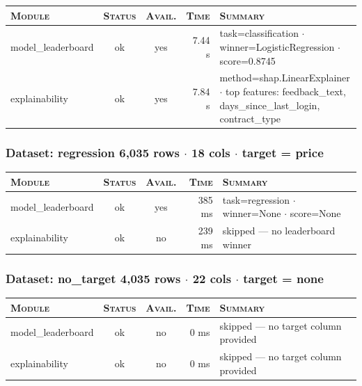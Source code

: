 \documentclass[11pt,a4paper]{article}
\begin{document}
\begin{tabularx}{\linewidth}{l c c r X}
\toprule
\textsc{Module} & \textsc{Status} & \textsc{Avail.} & \textsc{Time} & \textsc{Summary} \\
\midrule
model\_leaderboard & \textcolor{ok}{ok} & \textcolor{ok}{yes} & 7.44 s & task=classification $\cdot$ winner=LogisticRegression $\cdot$ score=0.8745 \\
explainability & \textcolor{ok}{ok} & \textcolor{ok}{yes} & 7.84 s & method=shap.LinearExplainer $\cdot$ top features: feedback\_text, days\_since\_last\_login, contract\_type \\
\bottomrule
\end{tabularx}


\subsubsection*{Dataset: regression
\hfill {\color{ink3}\footnotesize 6,035 rows
{$\boldsymbol{\cdot}$} 18 cols
{$\boldsymbol{\cdot}$} target = price}}

\begin{tabularx}{\linewidth}{l c c r X}
\toprule
\textsc{Module} & \textsc{Status} & \textsc{Avail.} & \textsc{Time} & \textsc{Summary} \\
\midrule
model\_leaderboard & \textcolor{ok}{ok} & \textcolor{ok}{yes} & 385 ms & task=regression $\cdot$ winner=None $\cdot$ score=None \\
explainability & \textcolor{ok}{ok} & \textcolor{ink3}{no} & 239 ms & skipped --- no leaderboard winner \\
\bottomrule
\end{tabularx}


\subsubsection*{Dataset: no\_target
\hfill {\color{ink3}\footnotesize 4,035 rows
{$\boldsymbol{\cdot}$} 22 cols
{$\boldsymbol{\cdot}$} target = none}}

\begin{tabularx}{\linewidth}{l c c r X}
\toprule
\textsc{Module} & \textsc{Status} & \textsc{Avail.} & \textsc{Time} & \textsc{Summary} \\
\midrule
model\_leaderboard & \textcolor{ok}{ok} & \textcolor{ink3}{no} & 0 ms & skipped --- no target column provided \\
explainability & \textcolor{ok}{ok} & \textcolor{ink3}{no} & 0 ms & skipped --- no target column provided \\
\bottomrule
\end{tabularx}
\end{document}
